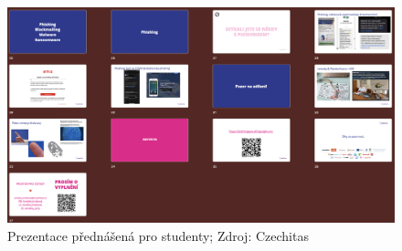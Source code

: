 \documentclass[12pt]{report}			%
\begin{document}
\begin{appendices}
        \begin{figure}[h]
            \centering
            \includegraphics[width=16cm]{Maturitni Prace/images/Screenshot 2023-01-29 at 19.09.57.png} 
            \caption{Prezentace přednášená pro studenty; Zdroj: Czechitas}
            \label{fig:prezentace_3}
        \end{figure} 
        
        
	\end{appendices}
\end{document}
